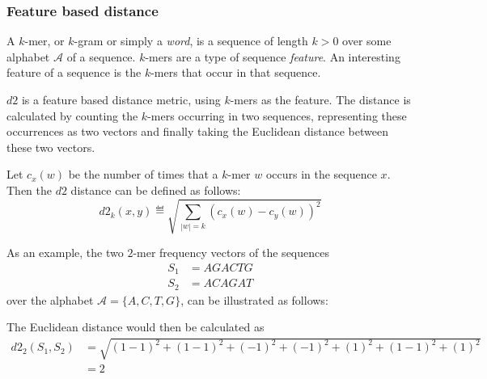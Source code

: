 \subsubsection{Feature based distance}
A $k$-mer, or $k$-gram or simply a \emph{word}, is a sequence of length
$k > 0$ over some alphabet $\mathcal{A}$ of a sequence. $k$-mers are a type
of sequence \emph{feature}. An interesting feature of a sequence is the
$k$-mers that occur in that sequence.

$d2$ is a feature based distance metric, using $k$-mers as the feature. The
distance is calculated by counting the $k$-mers occurring in two sequences,
representing these occurrences as two vectors and finally taking the Euclidean
distance between these two vectors.

Let $c_x(w)$ be the number of times that a $k$-mer $w$ occurs in the sequence
$x$. Then the $d2$ distance can be defined as follows:
\begin{equation}
  d2_k(x,y) \eqdef \sqrt{\sum_{|w|=k} (c_x(w) - c_y(w))^2}
\end{equation}

As an example, the two $2$-mer frequency vectors of the sequences
\begin{align*}
  S_1 &= AGACTG \\
  S_2 &= ACAGAT
\end{align*}
over the alphabet $\mathcal{A} = \{A,C,T,G\}$, can be illustrated as follows:

\begin{table}[!h]
\centering
{}
\end{table}

The Euclidean distance would then be calculated as
\begin{align*}
  d2_2(S_1, S_2)
    &= \sqrt{(1-1)^2 + (1-1)^2 + (-1)^2 + (-1)^2 + (1)^2 + (1-1)^2 + (1)^2} \\
    &= 2
\end{align*}

